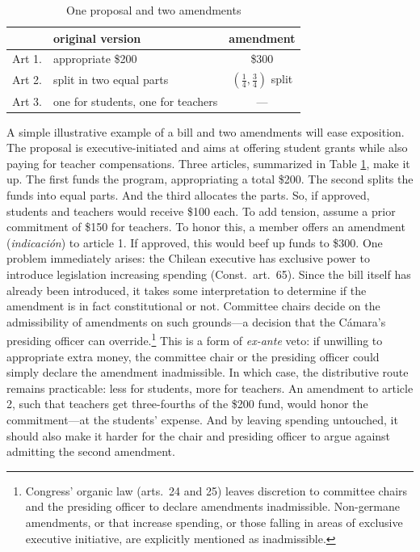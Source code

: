 \documentclass[letter,12pt]{article}
\begin{document}
\begin{table}
\begin{center}
\noindent \begin{tabular}{llc}
       & original version                   & amendment                                        \\ \hline
Art 1. & appropriate \$200                  & \$300                                            \\
Art 2. & split in two equal parts           & $(\frac{1}{4}, \frac{3}{4})$ split \\
Art 3. & one for students, one for teachers & ---                                              \\
\end{tabular}
\end{center}
\caption{One proposal and two amendments}\label{T:example}
\end{table}

A simple illustrative example of a bill and two amendments will ease exposition. The proposal is executive-initiated and aims at offering student grants while also paying for teacher compensations. Three articles, summarized in Table \ref{T:example}, make it up. The first funds the program, appropriating a total \$200. The second splits the funds into equal parts. And the third allocates the parts. So, if approved, students and teachers would receive \$100 each. To add tension, assume a prior commitment of \$150 for teachers. To honor this, a member offers an amendment (\emph{indicación}) to article 1. If approved, this would beef up funds to \$300. One problem immediately arises: the Chilean executive has exclusive power to introduce legislation increasing spending (Const.\ art.\ 65). Since the bill itself has already been introduced, it takes some interpretation to determine if the amendment is in fact constitutional or not. Committee chairs decide on the admissibility of amendments on such grounds---a decision that the Cámara's presiding officer can override.\footnote{Congress' organic law (arts.\ 24 and 25) leaves discretion to committee chairs and the presiding officer to declare amendments inadmissible. Non-germane amendments, or that increase spending, or those falling in areas of exclusive executive initiative, are explicitly mentioned as inadmissible.} This is a form of \emph{ex-ante} veto: if unwilling to appropriate extra money, the committee chair or the presiding officer could simply declare the amendment inadmissible. In which case, the distributive route remains practicable: less for students, more for teachers. An amendment to article 2, such that teachers get three-fourths of the \$200 fund, would honor the commitment---at the students' expense. And by leaving spending untouched, it should also make it harder for the chair and presiding officer to argue against admitting the second amendment. 
\end{document}
